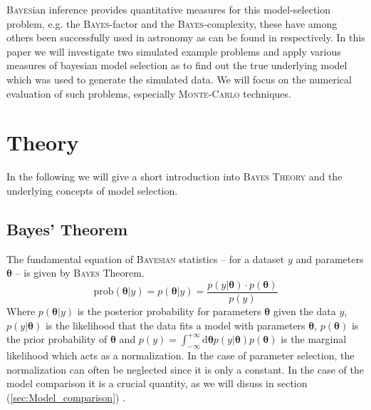 \documentclass[%
 reprint,
 amsmath,amssymb,
 aps,
]{revtex4-1}
\begin{document}
 {\color{red}
\textsc{Bayes}ian inference provides quantitative measures for this model-selection problem, e.g. the \textsc{Bayes}-factor and the \textsc{Bayes}-complexity}, these have among others been successfully used in astronomy as can be found in \cite{trotta,kunz,Trotta_2008} respectively. In this paper we will investigate two simulated example problems and apply various measures of bayesian model selection as to find out the true underlying model which was used to generate the simulated data. We will  focus on the numerical evaluation of such problems, especially\textsc{ Monte-Carlo} techniques.
\section{Theory}
\noindent In the following we will give a short introduction into \textsc{Bayes Theory} and the underlying concepts of model selection.
\subsection{Bayes' Theorem}
\noindent The fundamental equation of \textsc{Bayesian} statistics -- for a dataset $y$ and parameters $\boldsymbol{\theta}$ -- is given by \textsc{Bayes} Theorem.
\begin{equation}
\label{eq:bayes}
\text{prob}(\boldsymbol{\theta} | y) =	p(\boldsymbol{\theta} | y) = \frac{p(y|\boldsymbol{\theta})\cdot p(\boldsymbol{\theta})}{p(y)} 
\end{equation}
Where $p(\boldsymbol{\theta} | y) $ is the posterior probability for parameters $\boldsymbol{\theta}$ given the data $y$, $p(y|\boldsymbol{\theta})$ is the likelihood that the data fits a model with parameters $\boldsymbol{\theta}$, $p(\boldsymbol{\theta})$ is the prior probability of $\boldsymbol{\theta}$ and $p(y)= \int_{-\infty}^{+\infty}\text{d}\boldsymbol{\theta} p(y|\boldsymbol{\theta})p(\boldsymbol{\theta})$ is the marginal likelihood which acts as a normalization.  In the case of parameter selection, the normalization can often be neglected since it is only a  constant. In the case of the model comparison it is a crucial quantity, as we will disuss in section (\ref{sec:Model_comparison}) \cite[Chap. 2]{sivia}. 
\end{document}
